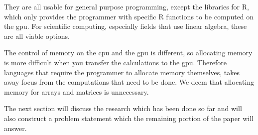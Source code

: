 They are all usable for general purpose programming, except the libraries for R, which only provides the programmer with specific R functions to be computed on the \acrshort{gpu}.
For scientific computing, especially fields that use linear algebra, these are all viable options.

The control of memory on the \acrshort{cpu} and the \acrshort{gpu} is different, so allocating memory is more difficult when you transfer the calculations to the \acrshort{gpu}.
Therefore languages that require the programmer to allocate memory themselves, takes away focus from the computations that need to be done.
We deem that allocating memory for arrays and matrices is unnecessary.

The next section will discuss the research which has been done so far and will also construct a problem statement which the remaining portion of the paper will answer.
